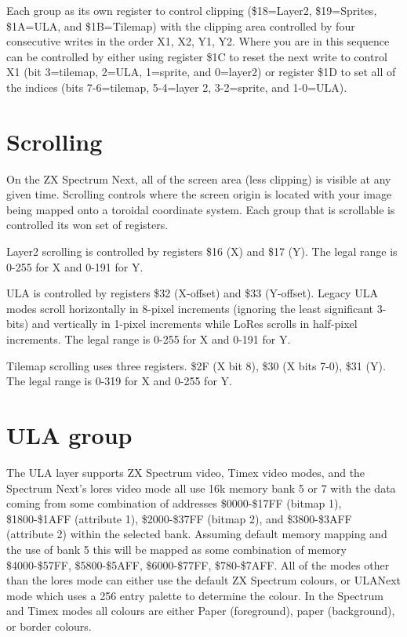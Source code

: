 Each group as its own register to control clipping (\$18=Layer2,
\$19=Sprites, \$1A=ULA, and \$1B=Tilemap) with the clipping area
controlled by four consecutive writes in the order X1, X2, Y1,
Y2. Where you are in this sequence can be controlled by either using
register \$1C to reset the next write to control X1 (bit 3=tilemap,
2=ULA, 1=sprite, and 0=layer2) or register \$1D to set all of the
indices (bits 7-6=tilemap, 5-4=layer 2, 3-2=sprite, and 1-0=ULA).

\section{Scrolling}

On the ZX Spectrum Next, all of the screen area (less clipping) is
visible at any given time. Scrolling controls where the screen origin
is located with your image being mapped onto a toroidal coordinate
system. Each group that is scrollable is controlled its won set of
registers.

Layer2 scrolling is controlled by registers \$16 (X) and \$17 (Y). The
legal range is 0-255 for X and 0-191 for Y.

ULA is controlled by registers \$32 (X-offset) and \$33
(Y-offset). Legacy ULA modes scroll horizontally in 8-pixel increments
(ignoring the least significant 3-bits) and vertically in 1-pixel
increments while LoRes scrolls in half-pixel increments. The legal
range is 0-255 for X and 0-191 for Y.

Tilemap scrolling uses three registers. \$2F (X bit 8), \$30 (X bits
7-0), \$31 (Y). The legal range is 0-319 for X and 0-255 for Y.

\section{ULA group}

The ULA layer supports ZX Spectrum video, Timex video modes, and the
Spectrum Next’s lores video mode all use 16k memory bank 5 or 7 with
the data coming from some combination of addresses \$0000-\$17FF
(bitmap 1), \$1800-\$1AFF (attribute 1), \$2000-\$37FF (bitmap 2), and
\$3800-\$3AFF (attribute 2) within the selected bank.  Assuming
default memory mapping and the use of bank 5 this will be mapped as
some combination of memory \$4000-\$57FF, \$5800-\$5AFF,
\$6000-\$77FF, \$780-\$7AFF. All of the modes other than the lores
mode can either use the default ZX Spectrum colours, or ULANext mode
which uses a 256 entry palette to determine the colour. In the
Spectrum and Timex modes all colours are either Paper (foreground),
paper (background), or border colours.


